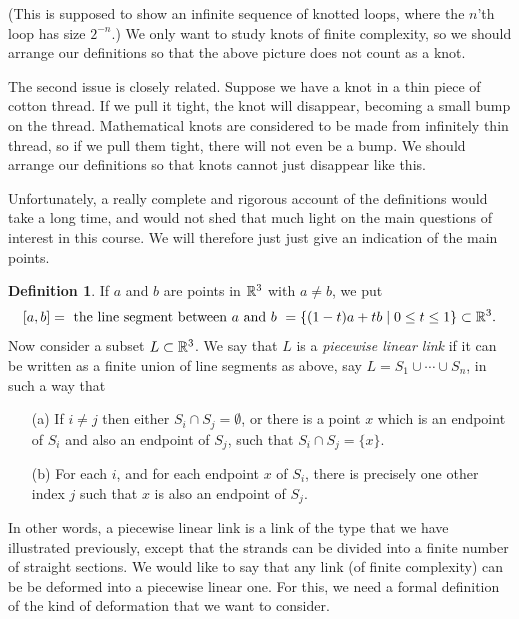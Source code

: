 \documentclass[reqno]{amsart}
\theoremstyle{definition}
\newtheorem{definition}[theorem]{Definition}
\begin{document}
(This is supposed to show an infinite sequence of knotted loops, where
the $n$'th loop has size $2^{-n}$.)  We only want to study knots of
finite complexity, so we should arrange our definitions so that the
above picture does not count as a knot.  

The second issue is closely related.  Suppose we have a knot in a thin
piece of cotton thread.  If we pull it tight, the knot will disappear,
becoming a small bump on the thread.  Mathematical knots are
considered to be made from infinitely thin thread, so if we pull them
tight, there will not even be a bump.  We should arrange our
definitions so that knots cannot just disappear like this.

Unfortunately, a really complete and rigorous account of the
definitions would take a long time, and would not shed that much light
on the main questions of interest in this course.  We will therefore
just just give an indication of the main points.  

\begin{definition}
 If $a$ and $b$ are points in $\mathbb{R}^3$ with $a\neq b$, we put 
 \[ [a,b] = \text{ the line segment between $a$ and $b$ } 
     = \{(1-t)a+tb\;|\; 0\leq t\leq 1\} \subset\mathbb{R}^3.
 \]
 Now consider a subset $L\subset\mathbb{R}^3$.  We say that $L$ is a
 \emph{piecewise linear link} if it can be written as a finite union
 of line segments as above, say $L=S_1\cup\dotsb\cup S_n$, in such a
 way that
 \begin{itemize}
  \item[(a)] If $i\neq j$ then either $S_i\cap S_j=\emptyset$, or
   there is a point $x$ which is an endpoint of $S_i$ and also an
   endpoint of $S_j$, such that $S_i\cap S_j=\{x\}$.
  \item[(b)] For each $i$, and for each endpoint $x$ of $S_i$, there
   is precisely one other index $j$ such that $x$ is also an endpoint
   of $S_j$.
 \end{itemize}
\end{definition}

In other words, a piecewise linear link is a link of the type that we
have illustrated previously, except that the strands can be divided
into a finite number of straight sections.  We would like to say that
any link (of finite complexity) can be be deformed into a piecewise
linear one.  For this, we need a formal definition of the kind of
deformation that we want to consider.
\end{document}
